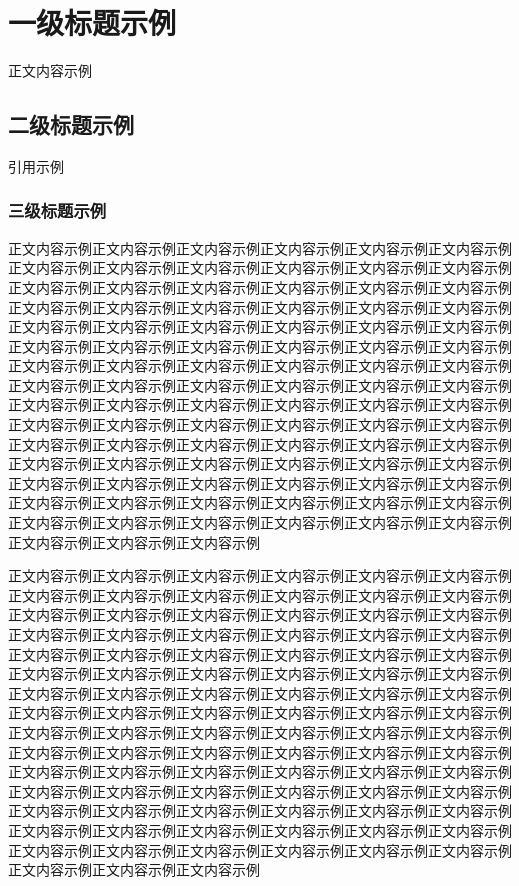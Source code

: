 \chapter{一级标题示例}

正文内容示例

\section{二级标题示例}

引用示例\cite{ref_example}

\subsection{三级标题示例}

正文内容示例正文内容示例正文内容示例正文内容示例正文内容示例正文内容示例正文内容示例正文内容示例正文内容示例正文内容示例正文内容示例正文内容示例正文内容示例正文内容示例正文内容示例正文内容示例正文内容示例正文内容示例正文内容示例正文内容示例正文内容示例正文内容示例正文内容示例正文内容示例正文内容示例正文内容示例正文内容示例正文内容示例正文内容示例正文内容示例正文内容示例正文内容示例正文内容示例正文内容示例正文内容示例正文内容示例正文内容示例正文内容示例正文内容示例正文内容示例正文内容示例正文内容示例正文内容示例正文内容示例正文内容示例正文内容示例正文内容示例正文内容示例正文内容示例正文内容示例正文内容示例正文内容示例正文内容示例正文内容示例正文内容示例正文内容示例正文内容示例正文内容示例正文内容示例正文内容示例正文内容示例正文内容示例正文内容示例正文内容示例正文内容示例正文内容示例正文内容示例正文内容示例正文内容示例正文内容示例正文内容示例正文内容示例正文内容示例正文内容示例正文内容示例正文内容示例正文内容示例正文内容示例正文内容示例正文内容示例正文内容示例正文内容示例正文内容示例正文内容示例正文内容示例正文内容示例正文内容示例正文内容示例正文内容示例正文内容示例正文内容示例正文内容示例正文内容示例

正文内容示例正文内容示例正文内容示例正文内容示例正文内容示例正文内容示例正文内容示例正文内容示例正文内容示例正文内容示例正文内容示例正文内容示例正文内容示例正文内容示例正文内容示例正文内容示例正文内容示例正文内容示例正文内容示例正文内容示例正文内容示例正文内容示例正文内容示例正文内容示例正文内容示例正文内容示例正文内容示例正文内容示例正文内容示例正文内容示例正文内容示例正文内容示例正文内容示例正文内容示例正文内容示例正文内容示例正文内容示例正文内容示例正文内容示例正文内容示例正文内容示例正文内容示例正文内容示例正文内容示例正文内容示例正文内容示例正文内容示例正文内容示例正文内容示例正文内容示例正文内容示例正文内容示例正文内容示例正文内容示例正文内容示例正文内容示例正文内容示例正文内容示例正文内容示例正文内容示例正文内容示例正文内容示例正文内容示例正文内容示例正文内容示例正文内容示例正文内容示例正文内容示例正文内容示例正文内容示例正文内容示例正文内容示例正文内容示例正文内容示例正文内容示例正文内容示例正文内容示例正文内容示例正文内容示例正文内容示例正文内容示例正文内容示例正文内容示例正文内容示例正文内容示例正文内容示例正文内容示例正文内容示例正文内容示例正文内容示例正文内容示例正文内容示例正文内容示例

